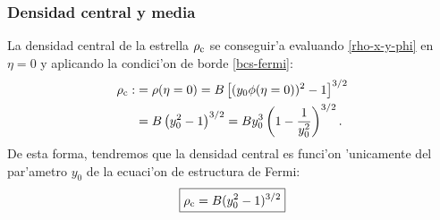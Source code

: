 \subsubsection{Densidad central y media}
La densidad central de la estrella $\rho_{\rm c}$ se conseguir'a evaluando \eqref{rho-x-y-phi} en $\eta=0$ y aplicando la condici'on de borde \eqref{bcs-fermi}:
\begin{align}
 \rho_{\rm c}:&=\rho(\eta=0)=B\left[(y_0\phi(\eta=0))^2-1\right]^{3/2}\\
&=B\left(y_0^2-1\right)^{3/2}=By_0^3\left(1-\frac{1}{y_0^2}\right)^{3/2}.\label{ec-fermi-byrho1}
\end{align}
De esta forma, tendremos que la densidad central es funci'on 'unicamente del par'ametro $y_0$ de la ecuaci'on de estructura de Fermi:
\begin{equation}\label{ec-fermi-byrho2}
 \boxed{\rho_{\rm c}=B(y_0^2-1)^{3/2}}
\end{equation}

